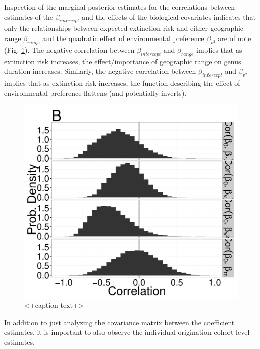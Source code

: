 \documentclass[12pt,letterpaper]{article}
\begin{document}
Inspection of the marginal posterior estimates for the correlations between estimates of the \(\beta_{intercept}\) and the effects of the biological covariates indicates that only the relationships between expected extinction risk and either geographic range \(\beta_{range}\) and the quadratic effect of environmental preference \(\beta_{v^{2}}\) are of note (Fig. \ref{fig:corr}). The negative correlation between \(\beta_{intercept}\) and \(\beta_{range}\) implies that as extinction risk increases, the effect/importance of geographic range on genus duration increases. Similarly, the negative correlation between \(\beta_{intercept}\) and \(\beta_{v^{2}}\) implies that as extinction risk increases, the function describing the effect of environmental preference flattens (and potentially inverts).
\begin{figure}[ht]
  \centering
  \includegraphics[height = 0.5\textheight,width=\textwidth,keepaspectratio=true]{figure/correlation_marginal}
  \caption{<+caption text+>}
  \label{fig:corr}
\end{figure}

In addition to just analyzing the covariance matrix between the coefficient estimates, it is important to also observe the individual origination cohort level estimates. 
\end{document}
